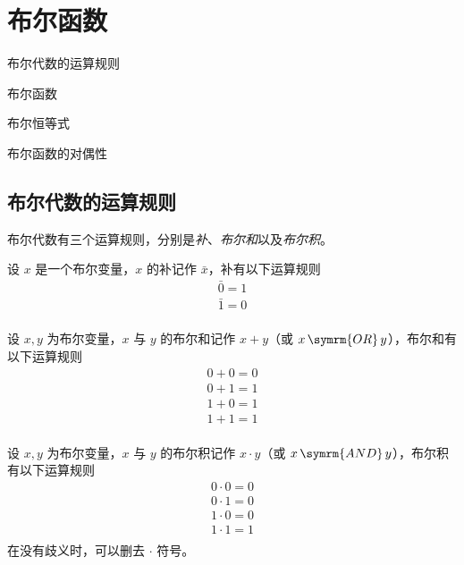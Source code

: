 \section{布尔函数}
\begin{introduction}
    \item 布尔代数的运算规则
    \item 布尔函数
    \item 布尔恒等式
    \item 布尔函数的对偶性
\end{introduction}

\subsection{布尔代数的运算规则}
布尔代数有三个运算规则，分别是\emph{补}、\emph{布尔和}以及\emph{布尔积}。

\begin{definition}[补]\label{def:补}
    设 $x$ 是一个布尔变量，$x$ 的补记作 $\bar{x}$，补有以下运算规则
    \begin{equation*}
        \begin{gathered}
            \bar{0} = 1 \\
            \bar{1} = 0 \\
        \end{gathered}
    \end{equation*}
\end{definition}
\begin{definition}[布尔和]\label{def:布尔和}
    设 $x, y$ 为布尔变量，$x$ 与 $y$ 的布尔和记作 $x + y$（或 $x \mathop{\symrm{OR}} y$），布尔和有以下运算规则
    \begin{equation*}
        \begin{gathered}
            0 + 0 = 0 \\
            0 + 1 = 1 \\
            1 + 0 = 1 \\
            1 + 1 = 1 \\
        \end{gathered}
    \end{equation*}
\end{definition}
\begin{definition}[布尔积]\label{def:布尔积}
    设 $x, y$ 为布尔变量，$x$ 与 $y$ 的布尔积记作 $x \cdot y$（或 $x \mathop{\symrm{AND}} y$），布尔积有以下运算规则
    \begin{equation*}
        \begin{gathered}
            0 \cdot 0 = 0 \\
            0 \cdot 1 = 0 \\
            1 \cdot 0 = 0 \\
            1 \cdot 1 = 1 \\
        \end{gathered}
    \end{equation*}
    在没有歧义时，可以删去 $\cdot$ 符号。
\end{definition}

